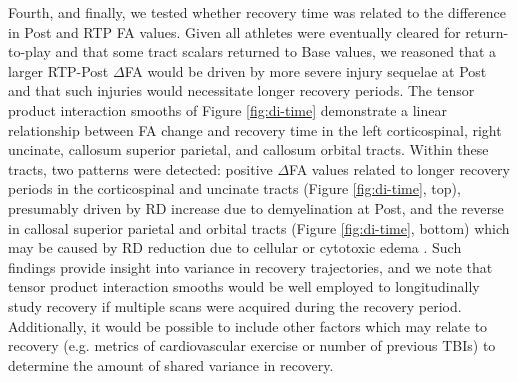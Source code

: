 \documentclass[]{imag-ms-template}
\begin{document}
Fourth, and finally, we tested whether recovery time was related to the difference in Post and RTP FA values. Given all athletes were eventually cleared for return-to-play and that some tract scalars returned to Base values, we reasoned that a larger RTP-Post $\Delta$FA would be driven by more severe injury sequelae at Post and that such injuries would necessitate longer recovery periods. The tensor product interaction smooths of Figure \ref{fig:di-time} demonstrate a linear relationship between FA change and recovery time in the left corticospinal, right uncinate, callosum superior parietal, and callosum orbital tracts. Within these tracts, two patterns were detected: positive $\Delta$FA values related to longer recovery periods in the corticospinal and uncinate tracts (Figure \ref{fig:di-time}, top), presumably driven by RD increase due to demyelination at Post, and the reverse in callosal superior parietal and orbital tracts (Figure \ref{fig:di-time}, bottom) which may be caused by RD reduction due to cellular or cytotoxic edema \parencite{mayer2017SpectrumMildTraumatic,borja2018DiffusionMRImaging}. Such findings provide insight into variance in recovery trajectories, and we note that tensor product interaction smooths would be well employed to longitudinally study recovery if multiple scans were acquired during the recovery period. Additionally, it would be possible to include other factors which may relate to recovery (e.g. metrics of cardiovascular exercise or number of previous TBIs) to determine the amount of shared variance in recovery.
\end{document}
